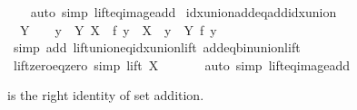 \begin{isabellebody}
%
\isadelimproof
\ \ %
\endisadelimproof
%
\isatagproof
{}\isamarkupfalse%
\ {\isacharparenleft}{\kern0pt}auto\ simp{\isacharcolon}{\kern0pt}\ lift{\isacharunderscore}{\kern0pt}eq{\isacharunderscore}{\kern0pt}image{\isacharunderscore}{\kern0pt}add{\isacharparenright}{\kern0pt}%
\endisatagproof
{\isafoldproof}%
%
\isadelimproof
\isanewline
%
\endisadelimproof
\isanewline
{}\isamarkupfalse%
\ idx{\isacharunderscore}{\kern0pt}union{\isacharunderscore}{\kern0pt}add{\isacharunderscore}{\kern0pt}eq{\isacharunderscore}{\kern0pt}add{\isacharunderscore}{\kern0pt}idx{\isacharunderscore}{\kern0pt}union{\isacharcolon}{\kern0pt}\isanewline
\ \ {\isachardoublequoteopen}Y\ {\isasymnoteq}\ {\isacharbraceleft}{\kern0pt}{\isacharbraceright}{\kern0pt}\ {\isasymLongrightarrow}\ {\isacharparenleft}{\kern0pt}{\isasymUnion}y\ {\isasymin}\ Y{\isachardot}{\kern0pt}\ X\ {\isacharplus}{\kern0pt}\ f\ y{\isacharparenright}{\kern0pt}\ {\isacharequal}{\kern0pt}\ X\ {\isacharplus}{\kern0pt}\ {\isacharparenleft}{\kern0pt}{\isasymUnion}y\ {\isasymin}\ Y{\isachardot}{\kern0pt}\ f\ y{\isacharparenright}{\kern0pt}{\isachardoublequoteclose}\isanewline
%
\isadelimproof
\ \ %
\endisadelimproof
%
\isatagproof
{}\isamarkupfalse%
\ {\isacharparenleft}{\kern0pt}simp\ add{\isacharcolon}{\kern0pt}\ lift{\isacharunderscore}{\kern0pt}union{\isacharunderscore}{\kern0pt}eq{\isacharunderscore}{\kern0pt}idx{\isacharunderscore}{\kern0pt}union{\isacharunderscore}{\kern0pt}lift\ add{\isacharunderscore}{\kern0pt}eq{\isacharunderscore}{\kern0pt}bin{\isacharunderscore}{\kern0pt}union{\isacharunderscore}{\kern0pt}lift{\isacharparenright}{\kern0pt}%
\endisatagproof
{\isafoldproof}%
%
\isadelimproof
\isanewline
%
\endisadelimproof
\isanewline
{}\isamarkupfalse%
\ lift{\isacharunderscore}{\kern0pt}zero{\isacharunderscore}{\kern0pt}eq{\isacharunderscore}{\kern0pt}zero\ {\isacharbrackleft}{\kern0pt}simp{\isacharbrackright}{\kern0pt}{\isacharcolon}{\kern0pt}\ {\isachardoublequoteopen}lift\ X\ {}\ {\isacharequal}{\kern0pt}\ {}{\isachardoublequoteclose}\isanewline
%
\isadelimproof
\ \ %
\endisadelimproof
%
\isatagproof
{}\isamarkupfalse%
\ {\isacharparenleft}{\kern0pt}auto\ simp{\isacharcolon}{\kern0pt}\ lift{\isacharunderscore}{\kern0pt}eq{\isacharunderscore}{\kern0pt}image{\isacharunderscore}{\kern0pt}add{\isacharparenright}{\kern0pt}%
\endisatagproof
{\isafoldproof}%
%
\isadelimproof
%
\endisadelimproof
%
\begin{isamarkuptext}%
 is the right identity of set addition.%

\end{isamarkuptext}
\end{isabellebody}
